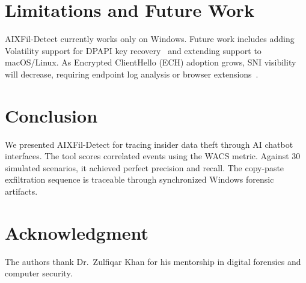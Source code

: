 \documentclass[conference]{IEEEtran}
\begin{document}
\section{Limitations and Future Work}
\label{sec:limitations}

AIXFil-Detect currently works only on Windows. Future work includes
adding Volatility support for DPAPI key recovery~\cite{javed2022survey}
and extending support to macOS/Linux. As Encrypted ClientHello (ECH)
adoption grows, SNI visibility will decrease, requiring endpoint log
analysis or browser extensions~\cite{zhou2024tls}.


\section{Conclusion}
\label{sec:conclusion}

We presented AIXFil-Detect for tracing insider data theft through AI
chatbot interfaces. The tool scores correlated events using the WACS
metric. Against 30 simulated scenarios, it achieved perfect precision
and recall. The copy-paste exfiltration sequence is traceable through
synchronized Windows forensic artifacts.


\section*{Acknowledgment}

The authors thank Dr.~Zulfiqar Khan for his mentorship in digital
forensics and computer security.






\end{document}
